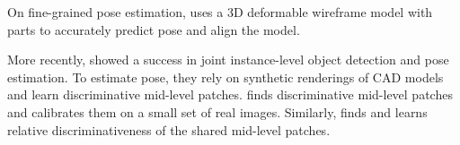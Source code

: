 \documentclass[10pt,twocolumn,letterpaper]{article}
\begin{document}
On fine-grained pose estimation, \cite{Zia13} uses a 3D deformable wireframe model with parts to accurately predict pose and align the model. 

More recently, \cite{Aubry14, Lim14} showed a success in joint instance-level object detection and pose estimation. To estimate pose, they rely on synthetic renderings of CAD models and learn discriminative mid-level patches. \cite{Aubry14} finds discriminative mid-level patches and calibrates them on a small set of real images. Similarly, \cite{Lim14} finds and learns relative discriminativeness of the shared mid-level patches.

 
  
\end{document}
